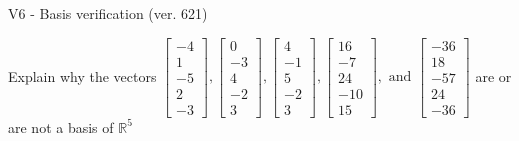 \begin{exercise}
  \begin{exerciseTitle}V6 - Basis verification (ver. 621)\end{exerciseTitle}
  \begin{exerciseStatement}
    Explain why the vectors \(\left[\begin{array}{r}
-4 \\
1 \\
-5 \\
2 \\
-3
\end{array}\right] , \left[\begin{array}{r}
0 \\
-3 \\
4 \\
-2 \\
3
\end{array}\right] , \left[\begin{array}{r}
4 \\
-1 \\
5 \\
-2 \\
3
\end{array}\right] , \left[\begin{array}{r}
16 \\
-7 \\
24 \\
-10 \\
15
\end{array}\right] , \text{ and } \left[\begin{array}{r}
-36 \\
18 \\
-57 \\
24 \\
-36
\end{array}\right]\) are or are not a basis of \(\mathbb{R}^5\)	



\end{exerciseStatement}
\end{exercise}
